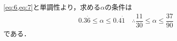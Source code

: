 \documentclass[../../main.tex]{subfiles}
\begin{document}
\cref{eq:6,eq:7}と単調性より，求める$\alpha$の条件は
\begin{align}
  0.3\dot{6}\le\alpha\le0.4\dot{1}
  \quad \therefore
  \dfrac{11}{30}\le\alpha\le\dfrac{37}{90}
\end{align}
である．

\end{document}
